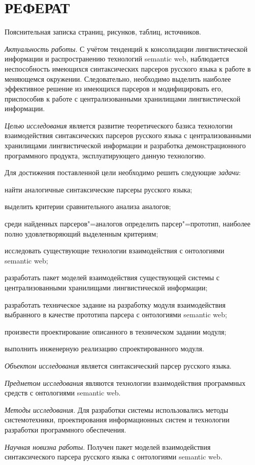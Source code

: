 \section*{\centering РЕФЕРАТ}

Пояснительная записка  страниц,  рисунков, 
таблиц,  источников.

\emph{Актуальность работы}. С учётом тенденций к консолидации лингвистической 
информации и распространению технологий semantic web, наблюдается неспособность
имеющихся синтаксических парсеров русского языка к работе в меняющемся окружении. 
Следовательно, необходимо выделить наиболее эффективное решение из имеющихся
парсеров и модифицировать его, приспособив к работе с централизованными
хранилищами лингвистической информации.

\emph{Целью исследования} является развитие теоретического базиса технологии
взаимодействия синтаксических парсеров русского языка с централизованными
хранилищами лингвистической информации и разработка демонстрационного программного
продукта, эксплуатирующего данную технологию.

Для достижения поставленной цели необходимо решить следующие \emph{задачи}:
\begin{list}{}{\leftmargin=1.5cm}
  \item найти аналогичные синтаксические парсеры русского языка;
  \item выделить критерии сравнительного анализа аналогов;
  \item среди найденных парсеров"=аналогов определить парсер"=прототип,
  наиболее полно удовлетворяющий выделенным критериям;
  \item исследовать существующие технологии взаимодействия с онтологиями \\
  semantic  web;
  \item разработать пакет моделей взаимодействия существующей системы с
  централизованными хранилищами лингвистической информации;
  \item разработать техническое задание на разработку модуля взаимодействия выбранного
  в качестве прототипа парсера с онтологиями semantic web;
  \item произвести проектирование описанного в техническом задании модуля;
  \item выполнить инженерную реализацию спроектированного модуля.
\end{list}

\emph{Объектом исследования} является синтаксический парсер русского языка.

\emph{Предметом исследования} являются технологии взаимодействия программных
средств с онтологиями semantic web.

\emph{Методы исследования}. Для разработки системы использовались методы
системотехники, проектирования информационных систем и технологии разработки
программного обеспечения.

\emph{Научная новизна работы}. Получен пакет моделей взаимодействия синтаксического
парсера русского языка с онтологиями semantic web.
